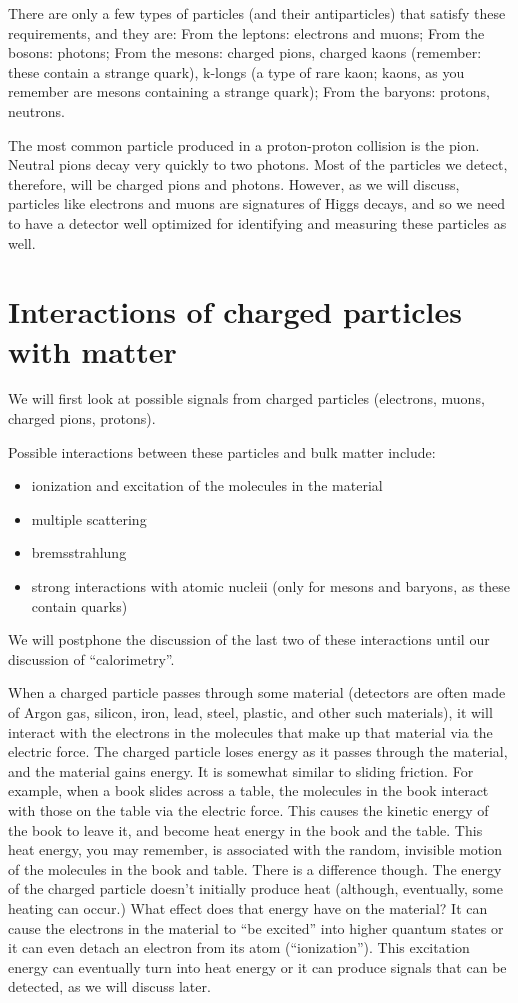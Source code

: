 There are only a few types of particles (and their antiparticles) that satisfy these requirements, and they are:  From the leptons: electrons and muons; From the bosons: photons; From the mesons:
charged pions, charged kaons (remember: these contain a strange quark), k-longs (a type of rare kaon; kaons, as you remember are mesons containing a strange quark); From the baryons: protons, neutrons.

The most common particle produced in a proton-proton collision is the pion.  Neutral pions decay very quickly to two photons. Most of the particles we detect, therefore, will be charged pions and photons.  However, as we will discuss, particles like electrons and muons are signatures of Higgs decays, and so we need to have a detector well optimized for identifying and measuring these particles as well.




\section{Interactions of charged particles with matter}
We will first look at possible signals from charged particles (electrons, muons, charged pions, protons).

Possible interactions between these particles and bulk matter include:
\begin{itemize}
\item ionization and excitation of the molecules in the material
\item multiple scattering
\item bremsstrahlung
\item strong interactions with atomic nucleii (only for mesons and baryons, as these contain quarks)
\end{itemize}
We will postphone the discussion of the last two of these interactions until our discussion of ``calorimetry''.

When a charged particle passes through some material (detectors are often made of Argon gas, silicon, iron, lead, steel, plastic, and other such materials), it will interact with the electrons in the molecules that make up that material via the electric force.  
The charged particle loses energy as it passes through the material, and the material gains energy.  
It is somewhat similar to sliding friction.  For example, when a book slides across a table, the molecules in the book interact with those on the table via the electric force.  This causes the kinetic energy of the book to leave it, and become heat energy in the book and the table.  This heat energy, you may remember, is associated with the random, invisible motion of the molecules in the book and table.  There is a difference though.  The energy of the charged particle doesn't initially produce heat (although, eventually, some heating can occur.)
What effect does that energy have on the material?  It can cause the electrons in the material to ``be excited'' into higher quantum states or it can even detach an electron from its atom (``ionization'').  This excitation energy can eventually turn into heat energy or it can produce signals that can be detected, as we will discuss later.

